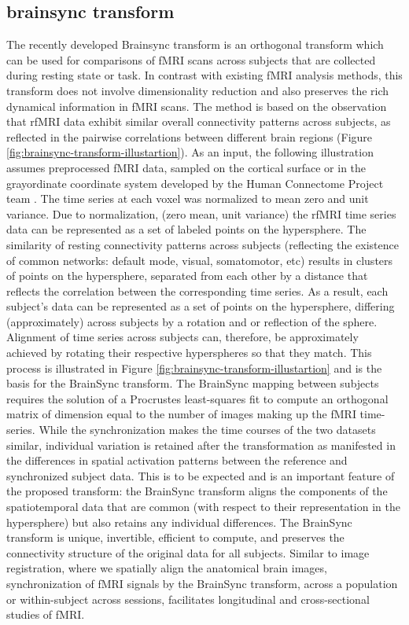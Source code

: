 \documentclass[preprint,12pt]{elsarticle}
\begin{document}
\subsection{brainsync transform}

The recently developed Brainsync transform is an orthogonal transform
\cite{descoteaux_brainsync:_2017,joshi_are_2018} which can be used
for comparisons of fMRI scans across subjects that are collected during
resting state or task. In contrast with existing fMRI analysis methods,
this transform does not involve dimensionality reduction and also
preserves the rich dynamical information in fMRI scans. The method
is based on the observation that rfMRI data exhibit similar overall
connectivity patterns across subjects, as reflected in the pairwise
correlations between different brain regions (Figure \ref{fig:brainsync-transform-illustartion}).
As an input, the following illustration assumes preprocessed fMRI
data, sampled on the cortical surface or in the grayordinate coordinate
system developed by the Human Connectome Project team \cite{glasser_minimal_2013}.
The time series at each voxel was normalized to mean zero and unit
variance. Due to normalization, (zero mean, unit variance) the rfMRI
time series data can be represented as a set of labeled points on
the hypersphere. The similarity of resting connectivity patterns across
subjects (reflecting the existence of common networks: default mode,
visual, somatomotor, etc) results in clusters of points on the hypersphere,
separated from each other by a distance that reflects the correlation
between the corresponding time series. As a result, each subject's
data can be represented as a set of points on the hypersphere, differing
(approximately) across subjects by a rotation and or reflection of
the sphere. Alignment of time series across subjects can, therefore,
be approximately achieved by rotating their respective hyperspheres
so that they match. This process is illustrated in Figure \ref{fig:brainsync-transform-illustartion}
and is the basis for the BrainSync transform. The BrainSync mapping
between subjects requires the solution of a Procrustes least-squares
fit \cite{gower_procrustes_2004,ten_berge_orthogonal_1977} to compute
an orthogonal matrix of dimension equal to the number of images making
up the fMRI time-series. While the synchronization makes the time
courses of the two datasets similar, individual variation is retained
after the transformation as manifested in the differences in spatial
activation patterns between the reference and synchronized subject
data. This is to be expected and is an important feature of the proposed
transform: the BrainSync transform aligns the components of the spatiotemporal
data that are common (with respect to their representation in the
hypersphere) but also retains any individual differences. The BrainSync
transform is unique, invertible, efficient to compute, and preserves
the connectivity structure of the original data for all subjects.
Similar to image registration, where we spatially align the anatomical
brain images, synchronization of fMRI signals by the BrainSync transform,
across a population or within-subject across sessions, facilitates
longitudinal and cross-sectional studies of fMRI.
\end{document}
